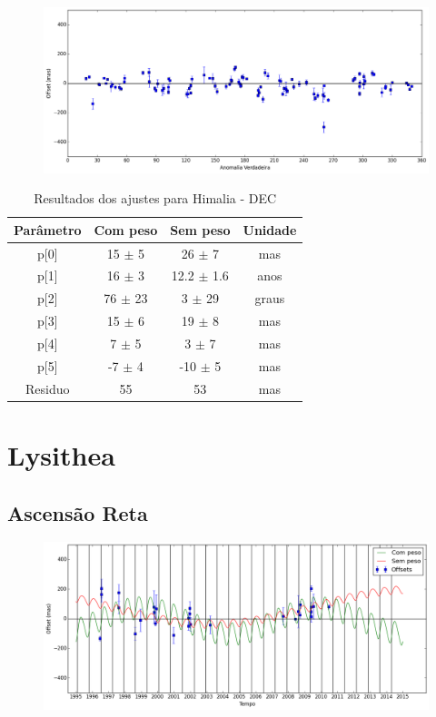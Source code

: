 \documentclass[11pt,a4paper]{report}
\begin{document}
\begin{figure}[h]
\includegraphics[scale=0.45]{Himalia/DEC_anom.png}  
\end{figure}

\begin{table}[h!]
\caption{\label{Tab: Himalia-DEC} Resultados dos ajustes para Himalia - DEC}
\begin{centering}
\begin{tabular}{cccc}
\hline
\hline
Parâmetro & Com peso & Sem peso & Unidade\tabularnewline
\hline
p[0] & 15 $\pm$ 5 & 26 $\pm$ 7 & mas\\
p[1] & 16 $\pm$ 3 & 12.2 $\pm$ 1.6 & anos\\
p[2] & 76 $\pm$ 23 & 3 $\pm$ 29 & graus\\
p[3] & 15 $\pm$ 6 & 19 $\pm$ 8 & mas\\
p[4] & 7 $\pm$ 5 & 3 $\pm$ 7 & mas\\
p[5] & -7 $\pm$ 4 & -10 $\pm$ 5 & mas\\
Residuo & 55 & 53 & mas\\
\hline 
\end{tabular} 
\par\end{centering}
\end{table}

\chapter*{Lysithea}
\section*{Ascensão Reta}

\begin{figure}[h]
\includegraphics[scale=0.45]{Lysithea/RA.png} 
\end{figure}
\end{document}
